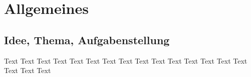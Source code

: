 \chapter{Allgemeines}
\section{Idee, Thema, Aufgabenstellung}
Text Text Text Text Text Text Text Text Text Text Text Text Text Text Text Text Text Text
